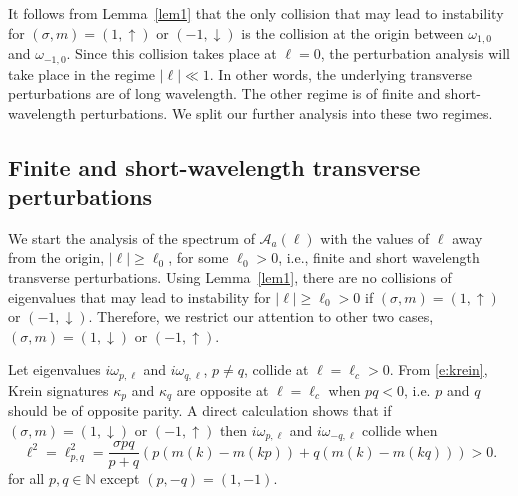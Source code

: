 \documentclass[12pt]{amsart}    %
\renewcommand{\geq}{\geqslant}
\renewcommand{\L}{\mathcal{L}}
\renewcommand{\k}{\kappa}
\newcommand{\N}{\mathbb{N}}
\newcommand{\oneu}{(1,\uparrow)}
\newcommand{\oned}{(1,\downarrow)}
\newcommand{\minu}{(-1,\uparrow)}
\newcommand{\mind}{(-1,\downarrow)}
\numberwithin{equation}{section}
\begin{document}
It follows from Lemma~\ref{lem1} that the only collision that may lead to instability for $(\sigma,m)=\oneu$ or $\mind$ is the collision at the origin between $\omega_{1,0}$ and $\omega_{-1,0}$. Since this collision takes place at $\ell=0$, the perturbation analysis will take place in the regime $|\ell|\ll 1$. In other words, the underlying transverse perturbations are of long wavelength. The other regime is of finite and short-wavelength perturbations. We split our further analysis into these two regimes.


\subsection{Finite and short-wavelength transverse perturbations}\label{s:fs}
We start the analysis of the spectrum of $\mathcal A_a(\ell)$ with the values of $\ell$ away from the origin, $|\ell|\geq \ell_0$, for some $\ell_0 > 0$, i.e., finite and short wavelength transverse perturbations. Using Lemma~\ref{lem1}, there are no collisions of eigenvalues that may lead to instability for $|\ell|\geq\ell_0>0$ if $(\sigma,m)=\oneu$ or $\mind$. Therefore, we restrict our attention to other two cases, $(\sigma,m)=\oned$ or $\minu$.


Let eigenvalues $i\omega_{p,\ell}$ and $i\omega_{q,\ell}$, $p \neq q$, collide at $\ell=\ell_c>0$. 
From \eqref{e:krein}, Krein signatures $\k_p$ and $\k_q$ are opposite at $\ell=\ell_c$ when $pq < 0$, i.e. $p$ and $q$ should be of opposite parity. 
A direct calculation shows that if $(\sigma,m)=\oned$ or $\minu$ then  $i\omega_{p,\ell}$ and $i\omega_{-q,\ell}$ collide when
\[
\ell^2 = \ell^2_{p,q} = \frac{\sigma pq}{p+q}(p(m(k)-m(kp))+q(m(k)-m(kq)))>0.
\]
for all $p, q \in \N$ except $(p,-q)=(1,-1)$.
\end{document}
